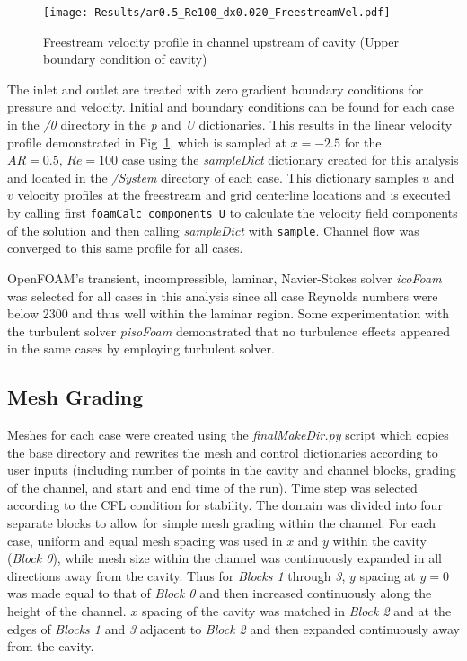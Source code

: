 \documentclass[twocolumn,10pt]{asme2ej}
\begin{document}
\vspace{-1em}
\begin{figure}[htb]
\begin{center}
\texttt{[image: Results/ar0.5\_Re100\_dx0.020\_FreestreamVel.pdf]}
\caption{Freestream velocity profile in channel upstream of cavity (Upper boundary condition of cavity)}
\label{FreestreamProfile}
\end{center}
\end{figure}
\vspace{-1em}

\noindent The inlet and outlet are treated with zero gradient boundary conditions for pressure and velocity.  Initial and boundary conditions can be found for each case in the \emph{/0} directory in the \emph{p} and \emph{U} dictionaries.  This results in the linear velocity profile demonstrated in Fig~\ref{FreestreamProfile}, which is sampled at $x=-2.5$ for the $AR=0.5,\,Re=100$ case using the \emph{sampleDict} dictionary created for this analysis and located in the \emph{/System} directory of each case.  This dictionary samples $u$ and $v$ velocity profiles at the freestream and grid centerline locations and is executed by calling first \texttt{foamCalc components U} to calculate the velocity field components of the solution and then calling \emph{sampleDict} with \texttt{sample}. Channel flow was converged to this same profile for all cases.

OpenFOAM$’$s transient, incompressible, laminar, Navier-Stokes solver \emph{icoFoam} was selected for all cases in this analysis since all case Reynolds numbers were below 2300 and thus well within the laminar region.  Some experimentation with the turbulent solver \emph{pisoFoam} demonstrated that no turbulence effects appeared in the same cases by employing turbulent solver.

\subsection{Mesh Grading}
Meshes for each case were created using the \emph{finalMakeDir.py} script which copies the base directory and rewrites the mesh and control dictionaries according to user inputs  (including number of points in the cavity and channel blocks, grading of the channel, and start and end time of the run).  Time step was selected according to the CFL condition for stability.  The domain was divided into four separate blocks to allow for simple mesh grading within the channel.  For each case, uniform and equal mesh spacing was used in $x$ and $y$ within the cavity (\emph{Block 0}), while mesh size within the channel was continuously expanded in all directions away from the cavity.  Thus for \emph{Blocks 1} through \emph{3}, $y$ spacing at $y=0$ was made equal to that of \emph{Block 0} and then increased continuously along the height of the channel.  $x$ spacing of the cavity was matched in \emph{Block 2} and at the edges of \emph{Blocks 1} and \emph{3} adjacent to \emph{Block 2} and then expanded continuously away from the cavity.
\end{document}
